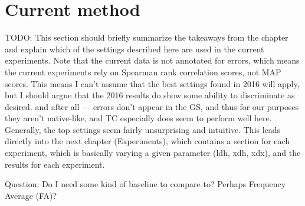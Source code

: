 %


\section{Current method}
TODO:
This section should briefly summarize the takeaways from the chapter and explain which of the settings described here are used in the current experiments.
Note that the current data is not annotated for errors, which means the current experiments rely on Spearman rank correlation scores, not MAP scores. This means I can't assume that the best settings found in 2016 will apply, but I should argue that the 2016 results do show some ability to discriminate as desired. and after all --- errors don't appear in the GS, and thus for our purposes they aren't native-like, and TC especially does seem to perform well here. Generally, the top settings seem fairly unsurprising and intuitive.
This leads directly into the next chapter (Experiments), which contains a section for each experiment, which is basically varying a given parameter (ldh, xdh, xdx), and the results for each experiment.

Question:
Do I need some kind of baseline to compare to? Perhaps Frequency Average (FA)?